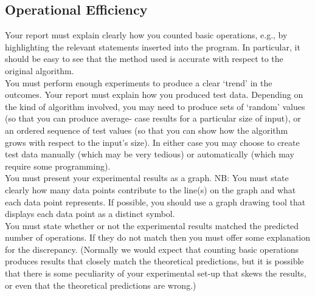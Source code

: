 \documentclass[]{article}
\begin{document}
\subsection{Operational Efficiency}
Your report must explain clearly how you counted basic operations, e.g., by highlighting the
relevant statements inserted into the program. In particular, it should be easy to see that the
method used is accurate with respect to the original algorithm.
\\
You must perform enough experiments to produce a clear ‘trend’ in the outcomes. Your
report must explain how you produced test data. Depending on the kind of algorithm
involved, you may need to produce sets of ‘random’ values (so that you can produce average-
case results for a particular size of input), or an ordered sequence of test values (so that you
can show how the algorithm grows with respect to the input’s size). In either case you may
choose to create test data manually (which may be very tedious) or automatically (which may
require some programming).
\\
You must present your experimental results as a graph. NB: You must state clearly how many
data points contribute to the line(s) on the graph and what each data point represents. If
possible, you should use a graph drawing tool that displays each data point as a distinct
symbol.
\\
You must state whether or not the experimental results matched the predicted number of
operations. If they do not match then you must offer some explanation for the discrepancy.
(Normally we would expect that counting basic operations produces results that closely match
the theoretical predictions, but it is possible that there is some peculiarity of your experimental
set-up that skews the results, or even that the theoretical predictions are wrong.)
\end{document}
